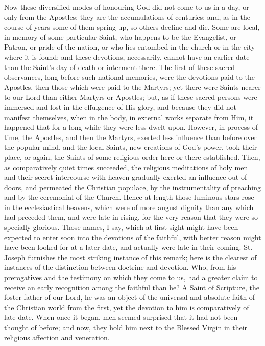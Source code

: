 Now these diversified modes of honouring God did not come to us in a
day, or only from the Apostles; they are the accumulations of centuries;
and, as in the course of years some of them spring up, so others decline
and die. Some are local, in memory of some particular Saint, who happens
to be the Evangelist, or Patron, or pride of the nation, or who lies
entombed in the church or in the city where it is found; and these
devotions, necessarily, cannot have an earlier date than the Saint's day
of death or interment there. The first of these sacred observances, long
before such national memories, were the devotions paid to the Apostles,
then those which were paid to the Martyrs; yet there were Saints nearer
to our Lord than either Martyrs or Apostles; but, as if these sacred
persons were immersed and lost in the effulgence of His glory, and
because they did not manifest themselves, when in the body, in external
works separate from Him, it happened that for a long while they were
less dwelt upon. However, in process of time, the Apostles, and then the
Martyrs, exerted less influence than before over the popular mind, and
the local Saints, new creations of God's power, took their place, or
again, the Saints of some religious order here or there established.
Then, as comparatively quiet times succeeded, the religious meditations
of holy men and their secret intercourse with heaven gradually exerted
an influence out of doors, and permeated the Christian populace, by the
instrumentality of preaching and by the ceremonial of the Church. Hence
at length those luminous stars rose in the ecclesiastical heavens, which
were of more august dignity than any which had preceded them, and were
late in rising, for the very reason that they were so specially
glorious. Those names, I say, which at first sight might have been
expected to enter soon into the devotions of the faithful, with better
reason might have been looked for at a later date, and actually were
late in their coming. St. Joseph furnishes the most striking instance of
this remark; here is the clearest of instances of the distinction
between doctrine and devotion. Who, from his prerogatives and the
testimony on which they come to us, had a greater claim to receive an
early recognition among the faithful than he? A Saint of Scripture, the
foster-father of our Lord, he was an object of the universal and
absolute faith of the Christian world from the first, yet the devotion
to him is comparatively of late date. When once it began, men
seemed surprised that it had not been thought of before; and now, they
hold him next to the Blessed Virgin in their religious affection and
veneration.

